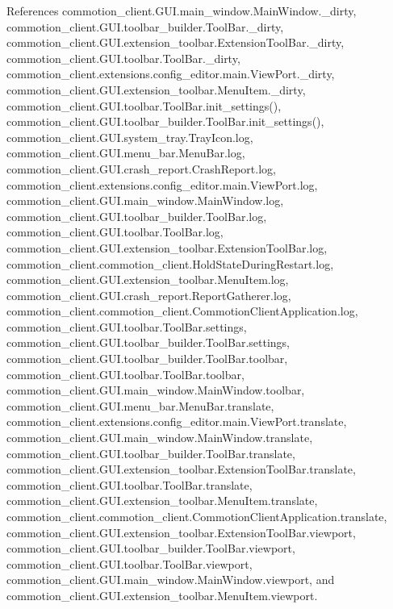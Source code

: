 References commotion\-\_\-client.\-G\-U\-I.\-main\-\_\-window.\-Main\-Window.\-\_\-dirty, commotion\-\_\-client.\-G\-U\-I.\-toolbar\-\_\-builder.\-Tool\-Bar.\-\_\-dirty, commotion\-\_\-client.\-G\-U\-I.\-extension\-\_\-toolbar.\-Extension\-Tool\-Bar.\-\_\-dirty, commotion\-\_\-client.\-G\-U\-I.\-toolbar.\-Tool\-Bar.\-\_\-dirty, commotion\-\_\-client.\-extensions.\-config\-\_\-editor.\-main.\-View\-Port.\-\_\-dirty, commotion\-\_\-client.\-G\-U\-I.\-extension\-\_\-toolbar.\-Menu\-Item.\-\_\-dirty, commotion\-\_\-client.\-G\-U\-I.\-toolbar.\-Tool\-Bar.\-init\-\_\-settings(), commotion\-\_\-client.\-G\-U\-I.\-toolbar\-\_\-builder.\-Tool\-Bar.\-init\-\_\-settings(), commotion\-\_\-client.\-G\-U\-I.\-system\-\_\-tray.\-Tray\-Icon.\-log, commotion\-\_\-client.\-G\-U\-I.\-menu\-\_\-bar.\-Menu\-Bar.\-log, commotion\-\_\-client.\-G\-U\-I.\-crash\-\_\-report.\-Crash\-Report.\-log, commotion\-\_\-client.\-extensions.\-config\-\_\-editor.\-main.\-View\-Port.\-log, commotion\-\_\-client.\-G\-U\-I.\-main\-\_\-window.\-Main\-Window.\-log, commotion\-\_\-client.\-G\-U\-I.\-toolbar\-\_\-builder.\-Tool\-Bar.\-log, commotion\-\_\-client.\-G\-U\-I.\-toolbar.\-Tool\-Bar.\-log, commotion\-\_\-client.\-G\-U\-I.\-extension\-\_\-toolbar.\-Extension\-Tool\-Bar.\-log, commotion\-\_\-client.\-commotion\-\_\-client.\-Hold\-State\-During\-Restart.\-log, commotion\-\_\-client.\-G\-U\-I.\-extension\-\_\-toolbar.\-Menu\-Item.\-log, commotion\-\_\-client.\-G\-U\-I.\-crash\-\_\-report.\-Report\-Gatherer.\-log, commotion\-\_\-client.\-commotion\-\_\-client.\-Commotion\-Client\-Application.\-log, commotion\-\_\-client.\-G\-U\-I.\-toolbar.\-Tool\-Bar.\-settings, commotion\-\_\-client.\-G\-U\-I.\-toolbar\-\_\-builder.\-Tool\-Bar.\-settings, commotion\-\_\-client.\-G\-U\-I.\-toolbar\-\_\-builder.\-Tool\-Bar.\-toolbar, commotion\-\_\-client.\-G\-U\-I.\-toolbar.\-Tool\-Bar.\-toolbar, commotion\-\_\-client.\-G\-U\-I.\-main\-\_\-window.\-Main\-Window.\-toolbar, commotion\-\_\-client.\-G\-U\-I.\-menu\-\_\-bar.\-Menu\-Bar.\-translate, commotion\-\_\-client.\-extensions.\-config\-\_\-editor.\-main.\-View\-Port.\-translate, commotion\-\_\-client.\-G\-U\-I.\-main\-\_\-window.\-Main\-Window.\-translate, commotion\-\_\-client.\-G\-U\-I.\-toolbar\-\_\-builder.\-Tool\-Bar.\-translate, commotion\-\_\-client.\-G\-U\-I.\-extension\-\_\-toolbar.\-Extension\-Tool\-Bar.\-translate, commotion\-\_\-client.\-G\-U\-I.\-toolbar.\-Tool\-Bar.\-translate, commotion\-\_\-client.\-G\-U\-I.\-extension\-\_\-toolbar.\-Menu\-Item.\-translate, commotion\-\_\-client.\-commotion\-\_\-client.\-Commotion\-Client\-Application.\-translate, commotion\-\_\-client.\-G\-U\-I.\-extension\-\_\-toolbar.\-Extension\-Tool\-Bar.\-viewport, commotion\-\_\-client.\-G\-U\-I.\-toolbar\-\_\-builder.\-Tool\-Bar.\-viewport, commotion\-\_\-client.\-G\-U\-I.\-toolbar.\-Tool\-Bar.\-viewport, commotion\-\_\-client.\-G\-U\-I.\-main\-\_\-window.\-Main\-Window.\-viewport, and commotion\-\_\-client.\-G\-U\-I.\-extension\-\_\-toolbar.\-Menu\-Item.\-viewport.


